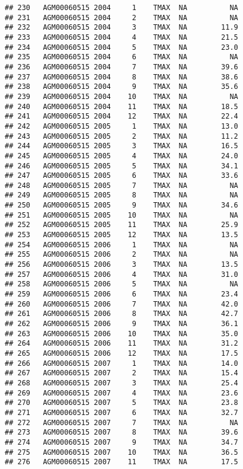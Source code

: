 \documentclass{article}\usepackage[]{graphicx}\usepackage[]{color}
\makeatletter
\newenvironment{kframe}{%
 \def\at@end@of@kframe{}%
 \ifinner\ifhmode%
  \def\at@end@of@kframe{\end{minipage}}%
  \begin{minipage}{\columnwidth}%
 \fi\fi%
 \def\FrameCommand##1{\hskip\@totalleftmargin \hskip-\fboxsep
 \colorbox{shadecolor}{##1}\hskip-\fboxsep
     \hskip-\linewidth \hskip-\@totalleftmargin \hskip\columnwidth}%
 \MakeFramed {\advance\hsize-\width
   \@totalleftmargin\z@ \linewidth\hsize
   \@setminipage}}%
 {\par\unskip\endMakeFramed%
 \at@end@of@kframe}
\newenvironment{knitrout}{}{} %
\makeatother
\begin{document}
\begin{knitrout}
\begin{kframe}
\begin{verbatim}
## 230   AGM00060515 2004     1    TMAX  NA          NA
## 231   AGM00060515 2004     2    TMAX  NA          NA
## 232   AGM00060515 2004     3    TMAX  NA        11.9
## 233   AGM00060515 2004     4    TMAX  NA        21.5
## 234   AGM00060515 2004     5    TMAX  NA        23.0
## 235   AGM00060515 2004     6    TMAX  NA          NA
## 236   AGM00060515 2004     7    TMAX  NA        39.6
## 237   AGM00060515 2004     8    TMAX  NA        38.6
## 238   AGM00060515 2004     9    TMAX  NA        35.6
## 239   AGM00060515 2004    10    TMAX  NA          NA
## 240   AGM00060515 2004    11    TMAX  NA        18.5
## 241   AGM00060515 2004    12    TMAX  NA        22.4
## 242   AGM00060515 2005     1    TMAX  NA        13.0
## 243   AGM00060515 2005     2    TMAX  NA        11.2
## 244   AGM00060515 2005     3    TMAX  NA        16.5
## 245   AGM00060515 2005     4    TMAX  NA        24.0
## 246   AGM00060515 2005     5    TMAX  NA        34.1
## 247   AGM00060515 2005     6    TMAX  NA        33.6
## 248   AGM00060515 2005     7    TMAX  NA          NA
## 249   AGM00060515 2005     8    TMAX  NA          NA
## 250   AGM00060515 2005     9    TMAX  NA        34.6
## 251   AGM00060515 2005    10    TMAX  NA          NA
## 252   AGM00060515 2005    11    TMAX  NA        25.9
## 253   AGM00060515 2005    12    TMAX  NA        13.5
## 254   AGM00060515 2006     1    TMAX  NA          NA
## 255   AGM00060515 2006     2    TMAX  NA          NA
## 256   AGM00060515 2006     3    TMAX  NA        13.5
## 257   AGM00060515 2006     4    TMAX  NA        31.0
## 258   AGM00060515 2006     5    TMAX  NA          NA
## 259   AGM00060515 2006     6    TMAX  NA        23.4
## 260   AGM00060515 2006     7    TMAX  NA        42.0
## 261   AGM00060515 2006     8    TMAX  NA        42.7
## 262   AGM00060515 2006     9    TMAX  NA        36.1
## 263   AGM00060515 2006    10    TMAX  NA        35.0
## 264   AGM00060515 2006    11    TMAX  NA        31.2
## 265   AGM00060515 2006    12    TMAX  NA        17.5
## 266   AGM00060515 2007     1    TMAX  NA        14.0
## 267   AGM00060515 2007     2    TMAX  NA        15.4
## 268   AGM00060515 2007     3    TMAX  NA        25.4
## 269   AGM00060515 2007     4    TMAX  NA        23.6
## 270   AGM00060515 2007     5    TMAX  NA        23.8
## 271   AGM00060515 2007     6    TMAX  NA        32.7
## 272   AGM00060515 2007     7    TMAX  NA          NA
## 273   AGM00060515 2007     8    TMAX  NA        39.6
## 274   AGM00060515 2007     9    TMAX  NA        34.7
## 275   AGM00060515 2007    10    TMAX  NA        36.5
## 276   AGM00060515 2007    11    TMAX  NA        17.5

\end{verbatim}
\end{kframe}
\end{knitrout}
\end{document}
